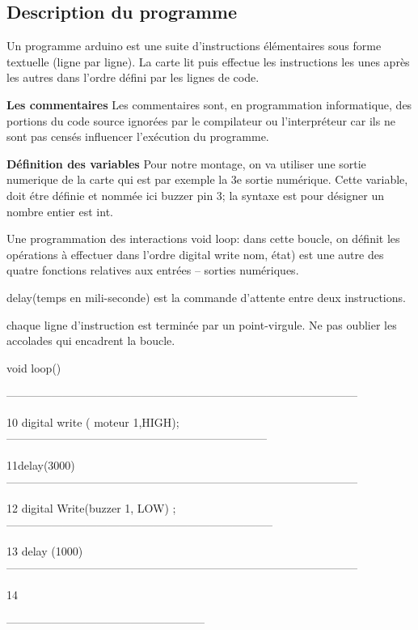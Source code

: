 \documentclass[12pt, openany]{report}
\begin{document}
         		
         	\newpage	
         		
         		
         		 \subsection{Description du programme}
         		 Un programme arduino est une suite d'instructions élémentaires sous forme textuelle
         		 (ligne par ligne). La carte lit puis effectue les instructions les unes après les autres dans l'ordre défini par les lignes de code.
         		
         		 \textbf{Les commentaires}
         		 Les commentaires sont, en programmation informatique, des portions du code source ignorées par le compilateur ou l'interpréteur car ils ne sont pas censés influencer l'exécution
         		 du programme.
         		
         		 \textbf{Définition des variables}
         		 Pour notre montage, on va utiliser une sortie numerique de la carte qui est par exemple
         		 la 3e sortie numérique. Cette variable, doit étre définie et nommée ici buzzer pin 3; la
         		 syntaxe est pour désigner un nombre entier est int.
         		
         		 Une programmation des interactions void loop: dans cette boucle, on définit les opérations à effectuer dans l'ordre digital write nom, état) est une autre des quatre fonctions relatives aux entrées – sorties numériques.
         		
         		 delay(temps en mili-seconde) est la commande d'attente entre deux instructions.
         		
         		 chaque ligne d'instruction est terminée par un point-virgule. Ne pas oublier les accolades qui encadrent la boucle.
         		
         		
         		 void loop()
         		
         		
         		 { ---------------------------------------------------------------------------------------------
         		
         		
         		 10 digital write ( moteur 1,HIGH);
         		 ---------------------------------------------------------------------
         		
         		 11delay(3000)---------------------------------------------------------------------------------------------
         		
         		 12 digital Write(buzzer 1, LOW) ;
         		 -----------------------------------------------------------------------
         		
         		 13 delay
         		 \vspace{1cm} (1000)---------------------------------------------------------------------------------------------
         		
         		 14 }-----------------------------------------------------
         		
\end{document}
